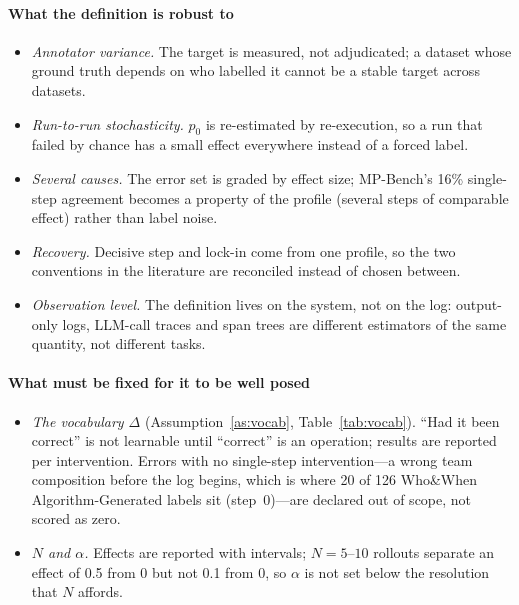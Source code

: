 \documentclass[10pt,a4paper]{article}
\begin{document}
\paragraph{What the definition is robust to}
\begin{itemize}[leftmargin=1.1em]
\item \emph{Annotator variance.} The target is measured, not adjudicated; a dataset whose ground truth depends on who labelled it cannot be a stable target across datasets.
\item \emph{Run-to-run stochasticity.} $p_0$ is re-estimated by re-execution, so a run that failed by chance has a small effect everywhere instead of a forced label.
\item \emph{Several causes.} The error set is graded by effect size; MP-Bench's 16\% single-step agreement becomes a property of the profile (several steps of comparable effect) rather than label noise.
\item \emph{Recovery.} Decisive step and lock-in come from one profile, so the two conventions in the literature are reconciled instead of chosen between.
\item \emph{Observation level.} The definition lives on the system, not on the log: output-only logs, LLM-call traces and span trees are different estimators of the same quantity, not different tasks.
\end{itemize}

\paragraph{What must be fixed for it to be well posed}
\begin{itemize}[leftmargin=1.1em]
\item \emph{The vocabulary $\Delta$} (Assumption~\ref{as:vocab}, Table~\ref{tab:vocab}). ``Had it been correct'' is not learnable until ``correct'' is an operation; results are reported per intervention. Errors with no single-step intervention---a wrong team composition before the log begins, which is where 20 of 126 Who\&When Algorithm-Generated labels sit (step~0)---are declared out of scope, not scored as zero.
\item \emph{$N$ and $\alpha$.} Effects are reported with intervals; $N=5$--$10$ rollouts separate an effect of 0.5 from 0 but not 0.1 from 0, so $\alpha$ is not set below the resolution that $N$ affords.
\end{itemize}
\end{document}
